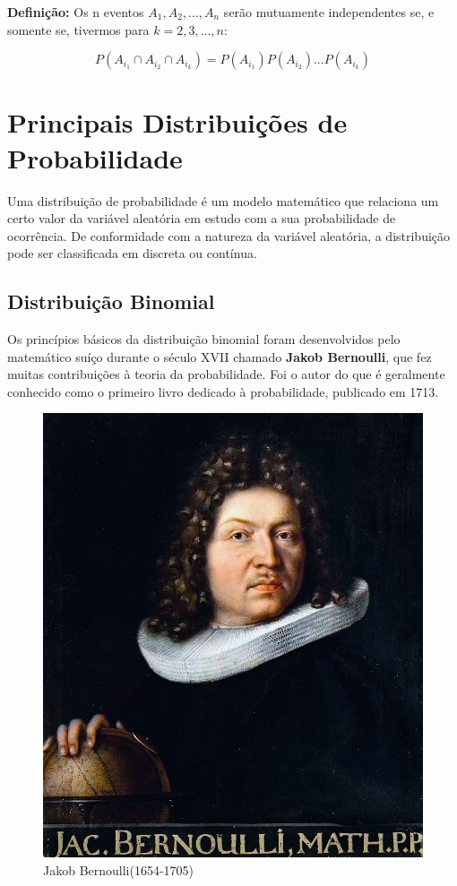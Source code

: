 \textbf{Definição:} Os n eventos $A_{1},A_{2},...,A_{n}$ serão
mutuamente independentes se, e somente se, tivermos para
$k=2,3,...,n$:

\begin{equation}\label{}
    P(A_{i_{1}} \cap A_{i_{2}} \cap A_{i_{k}})=
    P(A_{i_{1}})P(A_{i_{2}})...P(A_{i_{k}})
\end{equation}



\newpage
\section{Principais Distribuições de Probabilidade}
 
 
\inic Uma distribuição de probabilidade é um modelo matemático que relaciona um certo valor da variável aleatória em estudo com a sua probabilidade de ocorrência. De conformidade com a natureza da variável aleatória, a distribuição pode ser classificada em discreta ou contínua.
 
\subsection{Distribuição Binomial}

Os princípios básicos da distribuição binomial foram desenvolvidos pelo matemático suíço durante o século XVII chamado \textbf{Jakob Bernoulli}, que fez muitas contribuições à teoria da probabilidade. Foi o autor do que é geralmente conhecido como o primeiro livro dedicado à probabilidade, publicado em 1713.


\begin{figure}
    \centering
\includegraphics[scale=0.2]{figures/Jakob_Bernoulli.jpeg}
    \caption{Jakob Bernoulli(1654-1705)}
    \label{fig:my_label4}
\end{figure}

